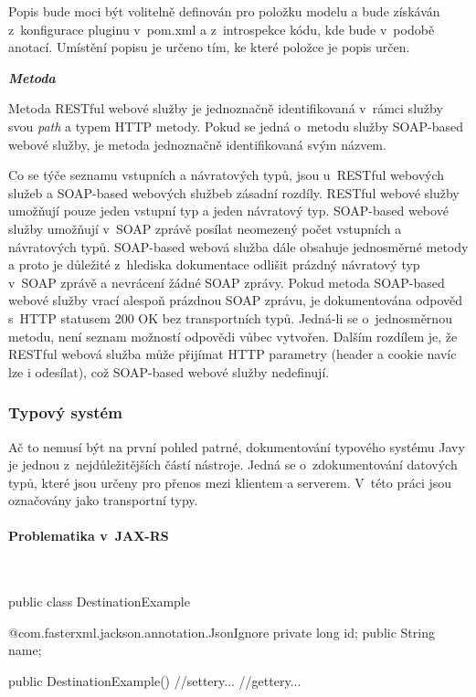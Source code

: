 \documentclass[11pt,twoside,a4paper]{book}
\begin{document}
Popis bude moci být volitelně definován pro položku modelu a bude získáván z~konfigurace
pluginu v~pom.xml a z~introspekce kódu, kde bude v~podobě anotací. Umístění popisu je
určeno tím, ke které položce je popis určen.

\textbf{\textit{Metoda}}

Metoda RESTful webové služby je jednoznačně identifikovaná v~rámci služby svou
{\em path} a typem HTTP metody.
Pokud se jedná o~metodu služby SOAP-based webové služby, je metoda jednoznačně
identifikovaná svým názvem.

Co se týče seznamu vstupních a návratových typů, jsou u~RESTful webových služeb
a SOAP-based webových službeb zásadní rozdíly. RESTful webové služby umožňují
pouze jeden vstupní typ a jeden návratový typ. SOAP-based webové služby umožňují
v~SOAP zprávě posílat neomezený počet vstupních a návratových typů. SOAP-based
webová služba dále obsahuje jednosměrné metody a proto je důležité z~hlediska
dokumentace odlišit prázdný návratový typ v~SOAP zprávě a nevrácení žádné SOAP
zprávy. Pokud metoda SOAP-based webové služby vrací alespoň prázdnou SOAP
zprávu, je dokumentována odpověd s~HTTP statusem 200 OK bez transportních typů.
Jedná-li se o~jednosměrnou metodu, není seznam možností odpovědi vůbec vytvořen.
Dalším rozdílem je, že RESTful webová služba může přijímat HTTP parametry
(header a cookie navíc lze i odesílat), což SOAP-based webové služby nedefinují.

\subsubsection{Typový systém}
\label{subsec:typovy-system}

Ač to nemusí být na první pohled patrné, dokumentování typového systému Javy je jednou
z~nejdůležitějších částí nástroje. Jedná se o~zdokumentování datových typů, které jsou určeny
pro přenos mezi klientem a serverem. V~této práci jsou označovány jako transportní typy.

\paragraph{Problematika v~JAX-RS}
\mbox{}\\

\begin{code}[frame=single,caption={Definice transportního
typu},label={lst:definice-transportniho-typu}] 
public class DestinationExample {

    @com.fasterxml.jackson.annotation.JsonIgnore
    private long id;
    public String name;

    public DestinationExample() {}
    //settery...
    //gettery...
}
\end{code}
\end{document}

